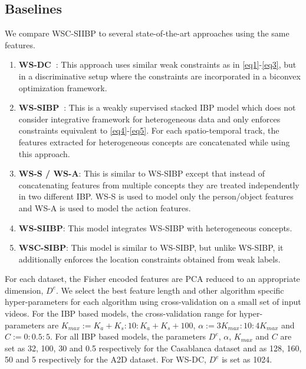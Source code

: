 \documentclass[runningheads]{llncs}
\begin{document}
\subsection{Baselines}
We compare WSC-SIIBP to several state-of-the-art approaches using the same features.
\begin{enumerate}[leftmargin=*,noitemsep]
\item {\bf WS-DC~\cite{bojanowski2013finding}}: This approach uses similar weak constraints as in \eqref{eq1}-\eqref{eq3}, but in a discriminative setup where the constraints are incorporated in a biconvex optimization framework.
\item {\bf WS-SIBP~\cite{shi2014weakly}}: This is a weakly supervised stacked IBP model which does not consider integrative framework for heterogeneous data and only enforces constraints equivalent to \eqref{eq4}-\eqref{eq5}. For each spatio-temporal track, the features extracted for heterogeneous concepts are concatenated while using this approach.
\item {\bf WS-S / WS-A}: This is similar to WS-SIBP except that instead of concatenating features from multiple concepts they are treated independently in two different IBP. WS-S is used to model only the person/object features and WS-A is used to model the action features.
\item {\bf WS-SIIBP}: This model integrates WS-SIBP with heterogeneous concepts. %
\item {\bf WSC-SIBP}: This model is similar to WS-SIBP, but unlike WS-SIBP, it additionally enforces the location constraints obtained from weak labels.
\end{enumerate}

 For each dataset, the Fisher encoded features are PCA reduced to an appropriate dimension, $D^{e}$. We select the best feature length and other algorithm specific hyper-parameters for each algorithm using cross-validation on a small set of input videos. For the IBP based models, the cross-validation range for hyper-parameters are $K_{max} := K_a + K_s : 10 : K_a + K_s + 100$, $\alpha := 3K_{max}: 10 : 4K_{max}$ and $C := 0 : 0.5 : 5$. For all IBP based models, the parameters $D^{e}$, $\alpha$, $K_{max}$ and $C$ are set as 32, 100, 30 and 0.5 respectively for the Casablanca dataset and as 128, 160, 50 and 5 respectively for the A2D dataset. For WS-DC, $D^{e}$ is set as 1024.
\end{document}
